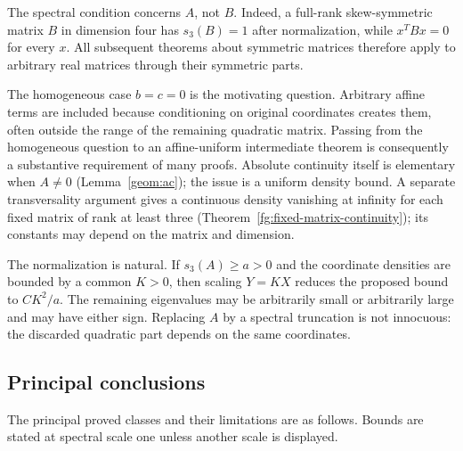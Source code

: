 \documentclass[11pt]{article}
\theoremstyle{definition}
\theoremstyle{remark}
\begin{document}
The spectral condition concerns $A$, not $B$. Indeed, a full-rank skew-symmetric matrix $B$ in dimension four has $s_3(B)=1$ after normalization, while $x^TBx=0$ for every $x$. All subsequent theorems about symmetric matrices therefore apply to arbitrary real matrices through their symmetric parts.

The homogeneous case $b=c=0$ is the motivating question. Arbitrary affine terms are included because conditioning on original coordinates creates them, often outside the range of the remaining quadratic matrix. Passing from the homogeneous question to an affine-uniform intermediate theorem is consequently a substantive requirement of many proofs. Absolute continuity itself is elementary when $A\ne0$ (Lemma~\ref{geom:ac}); the issue is a uniform density bound. A separate transversality argument gives a continuous density vanishing at infinity for each fixed matrix of rank at least three (Theorem~\ref{fg:fixed-matrix-continuity}); its constants may depend on the matrix and dimension.

The normalization is natural. If $s_3(A)\ge a>0$ and the coordinate densities are bounded by a common $K>0$, then scaling $Y=KX$ reduces the proposed bound to $CK^2/a$. The remaining eigenvalues may be arbitrarily small or arbitrarily large and may have either sign. Replacing $A$ by a spectral truncation is not innocuous: the discarded quadratic part depends on the same coordinates.

\subsection{Principal conclusions}

The principal proved classes and their limitations are as follows. Bounds are stated at spectral scale one unless another scale is displayed.
\end{document}
